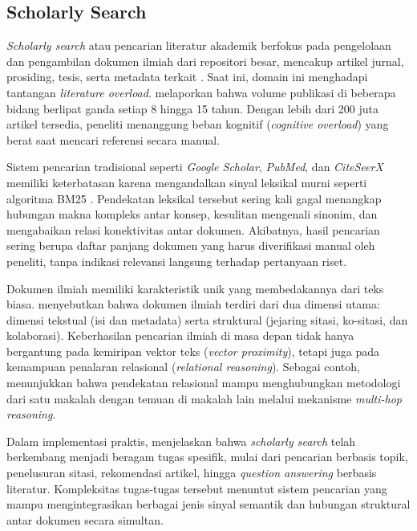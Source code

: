 \subsection{Scholarly Search}

\textit{Scholarly search} atau pencarian literatur akademik berfokus pada pengelolaan dan pengambilan dokumen ilmiah dari repositori besar, mencakup artikel jurnal, prosiding, tesis, serta metadata terkait \citep{Kasela_2025}. Saat ini, domain ini menghadapi tantangan \textit{literature overload}. \citet{Larsen2010} melaporkan bahwa volume publikasi di beberapa bidang berlipat ganda setiap 8 hingga 15 tahun. Dengan lebih dari 200 juta artikel tersedia, peneliti menanggung beban kognitif (\textit{cognitive overload}) yang berat saat mencari referensi secara manual.

Sistem pencarian tradisional seperti \textit{Google Scholar}, \textit{PubMed}, dan \textit{CiteSeerX} memiliki keterbatasan karena mengandalkan sinyal leksikal murni seperti algoritma BM25 \citep{10.1007/s11192-020-03690-4}. Pendekatan leksikal tersebut sering kali gagal menangkap hubungan makna kompleks antar konsep, kesulitan mengenali sinonim, dan mengabaikan relasi konektivitas antar dokumen. Akibatnya, hasil pencarian sering berupa daftar panjang dokumen yang harus diverifikasi manual oleh peneliti, tanpa indikasi relevansi langsung terhadap pertanyaan riset.

Dokumen ilmiah memiliki karakteristik unik yang membedakannya dari teks biasa. \citet{Shen2016ModelingTA} menyebutkan bahwa dokumen ilmiah terdiri dari dua dimensi utama: dimensi tekstual (isi dan metadata) serta struktural (jejaring sitasi, ko-sitasi, dan kolaborasi). Keberhasilan pencarian ilmiah di masa depan tidak hanya bergantung pada kemiripan vektor teks (\textit{vector proximity}), tetapi juga pada kemampuan penalaran relasional (\textit{relational reasoning}). Sebagai contoh, \citet{avgoren2025enhancing} menunjukkan bahwa pendekatan relasional mampu menghubungkan metodologi dari satu makalah dengan temuan di makalah lain melalui mekanisme \textit{multi-hop reasoning}.

Dalam implementasi praktis, \citet{9522111} menjelaskan bahwa \textit{scholarly search} telah berkembang menjadi beragam tugas spesifik, mulai dari pencarian berbasis topik, penelusuran sitasi, rekomendasi artikel, hingga \textit{question answering} berbasis literatur. Kompleksitas tugas-tugas tersebut menuntut sistem pencarian yang mampu mengintegrasikan berbagai jenis sinyal semantik dan hubungan struktural antar dokumen secara simultan.

